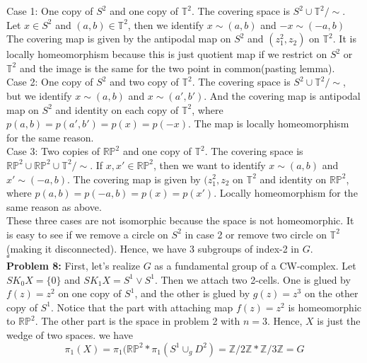 \documentclass[12pt]{amsart}
\newcommand{\Z}{\mathbb{Z}}
\begin{document}
Case 1: One copy of $S^2$ and one copy of $\mathbb{T}^2$. The covering space is $S^2\cup \mathbb{T}^2/\sim$. Let $x\in S^2$ and $(a,b)\in \mathbb{T}^2$, then we identify $x\sim(a,b)$ and $-x\sim (-a,b)$  The covering map is given by the antipodal map on $S^2$ and $(z_1^2,z_2)$ on $\mathbb{T}^2$. It is locally homeomorphism because this is just quotient map if we restrict on $S^2$ or $\mathbb{T}^2$ and the image is the same for the two point in common(pasting lemma).\\
Case 2: One copy of $S^2$ and two copy of $\mathbb{T}^2$. The covering space is $S^2\cup \mathbb{T}^2/\sim$, but we identify $x\sim (a,b)$ and $x\sim (a',b')$.  And the covering map is antipodal map on $S^2$ and identity on each copy of $\mathbb{T}^2$, where $p(a,b)=p(a',b')=p(x)=p(-x)$. The map is locally homeomorphism for the same reason.\\
Case 3: Two copies of $\mathbb{RP}^2$ and one copy of $\mathbb{T}^2$. The covering space is $\mathbb{RP}^2\cup \mathbb{RP}^2\cup \mathbb{T}^2/\sim $. If $x,x'\in \mathbb{RP}^2$, then we want to identify $x\sim (a,b)$ and $x'\sim (-a,b)$. The covering map is given by $(z_1^2,z_2$ on $\mathbb{T}^2$ and identity on $\mathbb{RP}^2$, where $p(a,b)=p(-a,b)=p(x)=p(x')$. Locally homeomorphism for the same reason as above.\\
These three cases are not isomorphic because the space is not homeomorphic. It is easy to see if we remove a circle on $S^2$ in case 2 or remove two circle on $\mathbb{T}^2$(making it disconnected). Hence, we have 3 subgroups of index-2 in $G$.
\\\phantom{qed}\hfill$\square$\\
\textbf{Problem 8:} First, let's realize $G$ as a fundamental group of a CW-complex. Let $SK_0X=\{0\}$ and $SK_1X=S^1\vee S^1$. Then we attach two 2-cells. One is glued by $f(z)=z^2$ on one copy of $S^1$, and the other is glued by $g(z)=z^3$ on the other copy of $S^1$. Notice that the part with attaching map $f(z)=z^2$ is homeomorphic to $\mathbb{RP}^2$. The other part is the space in problem 2 with $n=3$. Hence, $X$ is just the wedge of two spaces. we have 
\[\pi_1(X)=\pi_1(\mathbb{RP}^2\ast \pi_1(S^1\cup_g D^2)=\Z/2\Z\ast\Z/3\Z=G\]
\end{document}
